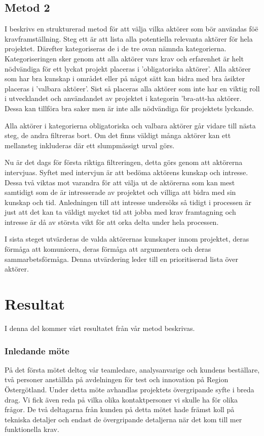 \subsection{Metod 2}
I \cite{cs_structured} beskrivs en strukturerad metod för att välja vilka aktörer som bör användas föë kravframställning. Steg ett är att lista alla potentiella relevanta aktörer för hela projektet.
Därefter kategoriseras de i de tre ovan nämnda kategorierna. Kategoriseringen sker genom att alla aktörer vars krav och erfarenhet är helt nödvändiga för ett lyckat projekt placeras i 'obligatoriska aktörer'. Alla aktörer som har bra kunskap i området eller på något sätt kan bidra med bra åsikter placeras i 'valbara aktörer'. Sist så placeras alla aktörer som inte har en viktig roll i utvecklandet och användandet av projektet i kategorin 'bra-att-ha aktörer. Dessa kan tillföra bra saker men är inte alls nödvändiga för projektets lyckande. 

Alla aktörer i kategorierna obligatoriska och valbara aktörer går vidare till nästa steg, de andra filtreras bort. Om det finns väldigt många aktörer kan ett mellansteg inkluderas där ett slumpmässigt urval görs.

Nu är det dags för första riktiga filtreringen, detta görs genom att aktörerna intervjuas. Syftet med intervjun är att bedöma aktörens kunskap och intresse. Dessa två viktas mot varandra för att välja ut de aktörerna som kan mest samtidigt som de är intresserade av projektet och villiga att bidra med sin kunskap och tid. Anledningen till att intresse undersöks så tidigt i processen är just att det kan ta väldigt mycket tid att jobba med krav framtagning och intresse är då av största vikt för att orka delta under hela processen. 

I sista steget utvärderas de valda aktörernas kunskaper innom projektet, deras förmåga att komunicera, deras förmåga att argumentera och deras sammarbetsförmåga. Denna utvärdering leder till en prioritiserad lista över aktörer.

\section{Resultat}
I denna del kommer vårt resultatet från vår metod beskrivas.
\subsubsection{Inledande möte}
På det första mötet deltog vår teamledare, analysanvarige och kundens beställare, två personer anställda på avdelningen för test och innovation på Region Östergötland. Under detta möte avhandlas projektets övergripande syfte i breda drag.
Vi fick även reda på vilka olika kontaktpersoner vi skulle ha för olika frågor. De två deltagarna från kunden på detta mötet hade främst koll på tekniska detaljer och endast de övergripande detaljerna när det kom till mer funktionella krav.

